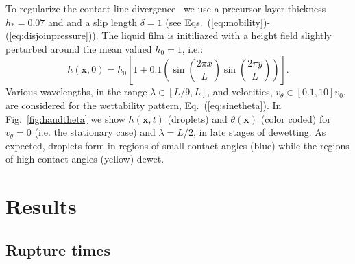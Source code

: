 \documentclass[twocolumn,amsmath,amssymb,showpacs,pre,nofootinbib,superscriptaddress]{revtex4-1} %
\begin{document}
To regularize the contact line divergence~\cite{huh1971hydrodynamic} we use a precursor layer thickness
$h_{\ast}=0.07$ and and a slip length $\delta = 1$
(see Eqs.~(\ref{eq:mobility})-(\ref{eq:disjoinpressure})). 
The liquid film is initiliazed with a height field slightly perturbed around the mean valued $h_0=1$, i.e.:
\begin{equation}\label{eq:hinitial}
    h(\mathbf{x},0) = h_0 \left[1 + 0.1 \left(\sin\left(\frac{2\pi x}{L}\right)\sin\left(\frac{2\pi y}{L}\right)\right)\right].
\end{equation}
Various wavelengths, in the range $\lambda \in [L/9, L]$, and velocities, $v_{\theta} \in [0.1, 10]v_0$,
are considered for the wettability pattern, Eq.~(\ref{eq:sinetheta}). 
In Fig.~\ref{fig:handtheta} we show $h(\mathbf{x},t)$ (droplets) and $\theta(\mathbf{x})$ (color coded) for $v_{\theta} = 0$ (i.e. the stationary case) and $\lambda = L/2$, in late stages of dewetting.
As expected, droplets form in regions of small contact angles (blue) while the regions of high contact angles (yellow) dewet.

\section{Results}\label{sec:results}

\subsection{Rupture times}\label{subsec:rupture}
\end{document}
